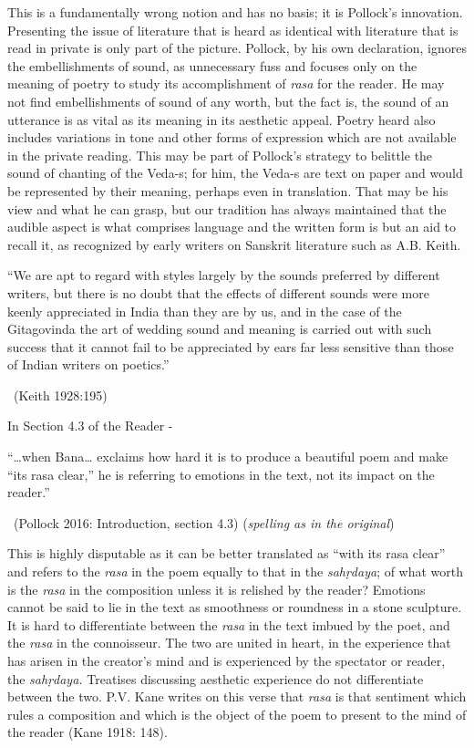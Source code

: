 This is a fundamentally wrong notion and has no basis; it is Pollock’s innovation. Presenting the issue of literature that is heard as identical with literature that is read in private is only part of the picture. Pollock, by his own declaration, ignores the embellishments of sound, as unnecessary fuss and focuses only on the meaning of poetry to study its accomplishment of \textit{rasa} for the reader. He may not find embellishments of sound of any worth, but the fact is, the sound of an utterance is as vital as its meaning in its aesthetic appeal. Poetry heard also includes variations in tone and other forms of expression which are not available in the private reading. This may be part of Pollock’s strategy to belittle the sound of chanting of the Veda-s; for him, the Veda-s are text on paper and would be represented by their meaning, perhaps even in translation. That may be his view and what he can grasp, but our tradition has always maintained that the audible aspect is what comprises language and the written form is but an aid to recall it, as recognized by early writers on Sanskrit literature such as A.B. Keith.

\begin{myquote}
“We are apt to regard with styles largely by the sounds preferred by different writers, but there is no doubt that the effects of different sounds were more keenly appreciated in India than they are by us, and in the case of the Gitagovinda the art of wedding sound and meaning is carried out with such success that it cannot fail to be appreciated by ears far less sensitive than those of Indian writers on poetics.” 

~\hfill (Keith 1928:195)
\end{myquote}

In Section 4.3 of the Reader -

\begin{myquote}
“…when Bana… exclaims how hard it is to produce a beautiful poem and make “its rasa clear,” he is referring to emotions in the text, not its impact on the reader.” 

~\hfill (Pollock 2016: Introduction, section 4.3) (\textit{spelling as in the original})
\end{myquote}

This is highly disputable as it can be better translated as “with its rasa clear” and refers to the \textit{rasa }in the poem equally to that in the \textit{sahṛdaya}; of what worth is the \textit{rasa} in the composition unless it is relished by the reader? Emotions cannot be said to lie in the text as smoothness or roundness in a stone sculpture. It is hard to differentiate between the \textit{rasa} in the text imbued by the poet, and the \textit{rasa} in the connoisseur. The two are united in heart, in the experience that has arisen in the creator’s mind and is experienced by the spectator or reader, the \textit{sahṛdaya.} Treatises discussing aesthetic experience do not differentiate between the two. P.V. Kane writes on this verse that \textit{rasa} is that sentiment which rules a composition and which is the object of the poem to present to the mind of the reader (Kane 1918: 148).

